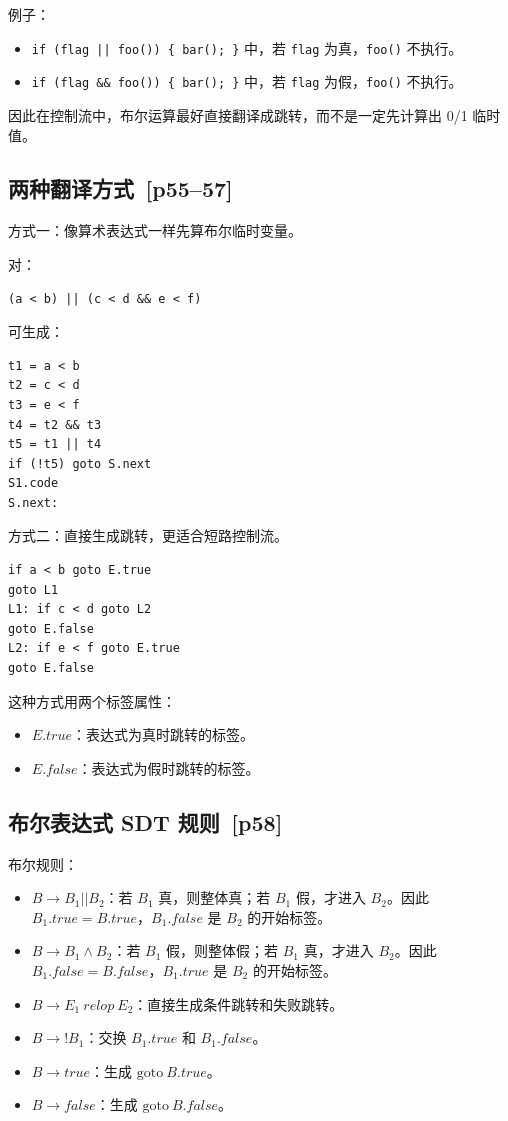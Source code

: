\documentclass[UTF8,fontset=none,11pt]{ctexart}
\newcommand{\pg}[1]{\texorpdfstring{{\small\color{graytext}\,[p#1]}}{ [p#1]}}
\begin{document}
例子：

\begin{itemize}
  \item \texttt{if (flag || foo()) \{ bar(); \}} 中，若 \texttt{flag} 为真，\texttt{foo()} 不执行。
  \item \texttt{if (flag \&\& foo()) \{ bar(); \}} 中，若 \texttt{flag} 为假，\texttt{foo()} 不执行。
\end{itemize}

因此在控制流中，布尔运算最好直接翻译成跳转，而不是一定先计算出 0/1 临时值。

\subsection{两种翻译方式 \pg{55--57}}

方式一：像算术表达式一样先算布尔临时变量。

对：
\begin{center}
\texttt{(a < b) || (c < d \&\& e < f)}
\end{center}
可生成：
\begin{verbatim}
t1 = a < b
t2 = c < d
t3 = e < f
t4 = t2 && t3
t5 = t1 || t4
if (!t5) goto S.next
S1.code
S.next:
\end{verbatim}

方式二：直接生成跳转，更适合短路控制流。

\begin{verbatim}
if a < b goto E.true
goto L1
L1: if c < d goto L2
goto E.false
L2: if e < f goto E.true
goto E.false
\end{verbatim}

这种方式用两个标签属性：

\begin{itemize}
  \item \(E.true\)：表达式为真时跳转的标签。
  \item \(E.false\)：表达式为假时跳转的标签。
\end{itemize}

\subsection{布尔表达式 SDT 规则 \pg{58}}

布尔规则：

\begin{itemize}
  \item \(B\to B_1||B_2\)：若 \(B_1\) 真，则整体真；若 \(B_1\) 假，才进入 \(B_2\)。因此 \(B_1.true=B.true\)，\(B_1.false\) 是 \(B_2\) 的开始标签。
  \item \(B\to B_1\land B_2\)：若 \(B_1\) 假，则整体假；若 \(B_1\) 真，才进入 \(B_2\)。因此 \(B_1.false=B.false\)，\(B_1.true\) 是 \(B_2\) 的开始标签。
  \item \(B\to E_1\ relop\ E_2\)：直接生成条件跳转和失败跳转。
  \item \(B\to !B_1\)：交换 \(B_1.true\) 和 \(B_1.false\)。
  \item \(B\to true\)：生成 \(\mathrm{goto}\ B.true\)。
  \item \(B\to false\)：生成 \(\mathrm{goto}\ B.false\)。
\end{itemize}
\end{document}
